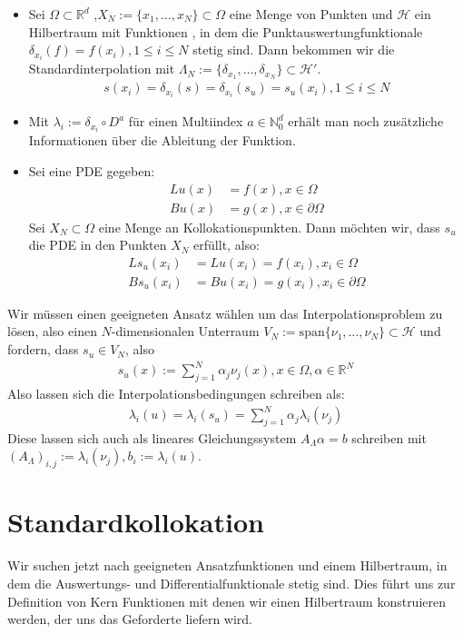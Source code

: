 \begin{example}
\begin{itemize}
\item
Sei $\Omega \subset \mathbb{R}^d$ ,$X_N := \{x_1, \dots, x_N\} \subset \Omega$ eine Menge von Punkten und $\mathcal{H}$ ein Hilbertraum mit Funktionen , in dem die Punktauswertungfunktionale $\delta_{x_i}(f) = f(x_i), 1\le i \le N$  stetig sind. Dann bekommen wir die Standardinterpolation mit $\Lambda_N := \{\delta_{x_1}, \dots,\delta_{x_N}\} \subset \mathcal{H}'$.
\begin{align*}
s(x_i) = \delta_{x_i}(s) = \delta_{x_i}(s_u) = s_u(x_i), 1\le i \le N
\end{align*}
\item
Mit $\lambda_i := \delta_{x_i} \circ D^a$ für einen Multiindex $a \in \mathbb{N}_0^d$ erhält man noch zusätzliche Informationen über die Ableitung der Funktion.
\item
Sei eine \ac{PDE} gegeben:
\begin{align*}
L u(x) &= f(x), x \in \Omega \\
B u(x) &= g(x), x \in \partial \Omega
\end{align*}
Sei $X_N \subset \Omega$ eine Menge an Kollokationspunkten. Dann möchten wir, dass $s_u$ die \ac{PDE} in den Punkten $X_N$ erfüllt, also:
\begin{align*}
L s_u(x_i) &= L u(x_i) = f(x_i), x_i \in \Omega \\
B s_u(x_i) &= B u(x_i) = g(x_i), x_i \in \partial \Omega
\end{align*}
\end{itemize}
\end{example}

Wir müssen einen geeigneten Ansatz wählen um das Interpolationsproblem zu lösen, also einen $N$-dimensionalen Unterraum $V_N := \text{span}\{\nu_1, \dots, \nu_N\} \subset \mathcal{H}$ und fordern, dass $s_u \in V_N$, also 
\begin{align*}
s_u(x) := \sum_{j=1}^N \alpha_j \nu_j(x), x \in \Omega, \alpha \in \mathbb{R}^N
\end{align*}
Also lassen sich die Interpolationsbedingungen schreiben als:
\begin{align*}
\lambda_i(u) = \lambda_i(s_u) = \sum_{j=1}^N \alpha_j \lambda_i(\nu_j)
\end{align*}
Diese lassen sich auch als lineares Gleichungssystem $A_\Lambda \alpha = b$ schreiben  mit $(A_\Lambda)_{i,j} := \lambda_i(\nu_j), b_i := \lambda_i(u)$.

\section{Standardkollokation}
Wir suchen jetzt nach geeigneten Ansatzfunktionen und einem Hilbertraum, in dem die Auswertungs- und Differentialfunktionale stetig sind. Dies führt uns zur Definition von Kern Funktionen mit denen wir einen Hilbertraum konstruieren werden, der uns das Geforderte liefern wird.

